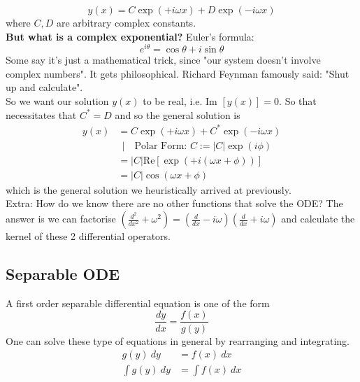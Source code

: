 \documentclass{article}
\begin{document}
$$y(x) = C \exp(+i\omega x) + D \exp(-i \omega x)$$
where $C,D$ are arbitrary complex constants.\\[10pt]
\textbf{But what is a complex exponential? } Euler's formula: 
$$e^{i\theta} = \cos \theta + i \sin \theta$$
Some say it's just a mathematical trick, since "our system doesn't involve complex numbers". It gets philosophical. Richard Feynman famously said: "Shut up and calculate". \\[10pt]
So we want our solution $y(x)$ to be real, i.e. $\text{Im }[y(x)] = 0$. So that necessitates that $C^* = D$ and so the general solution is 
\begin{align}
    y(x) &= C \exp(+i\omega x) + C^* \exp(-i\omega x)\\
    &\ \ |\quad \text{Polar Form: }C := |C| \exp(i \phi) \\
    &= |C| \text{Re}[\exp(+i (\omega x + \phi))] \\
    &= |C| \cos (\omega x + \phi)
\end{align}
which is the general solution we heuristically arrived at previously. \\[10pt]
Extra: How do we know there are no other functions that solve the ODE? The answer is we can factorise $\left(\frac{d^2}{dx^2} + \omega^2\right) = \left(\frac{d}{dx} - i\omega\right) \left(\frac{d}{dx} + i\omega\right)$ and calculate the kernel of these 2 differential operators.

\subsection{Separable ODE}
A first order separable differential equation is one of the form 
$$\frac{dy}{dx} = \frac{f(x)}{g(y)}$$
One can solve these type of equations in general by rearranging and integrating.
\begin{align}
    g(y)\ dy &= f(x)\ dx     \\
    \int g(y)\ dy &= \int f(x)\ dx
\end{align}
\end{document}
